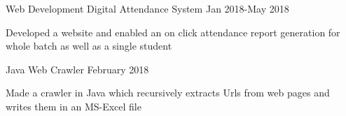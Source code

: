 \begin{cventries}
  \cventry
    {Web Development}
    {Digital Attendance System}
    {}
    {Jan 2018-May 2018}
    {
      \begin{cvitems}
        \item { Developed a website and enabled an on click attendance report generation for whole batch as well as a single student}
      \end{cvitems}
    }
    \cventry
    {Java}
    {Web Crawler}
     {}
    {February 2018}
    {
      \begin{cvitems}
        \item {Made a crawler in Java which recursively extracts Urls from web pages and writes them in an MS-Excel file }
      \end{cvitems}
    }
  

\end{cventries}
